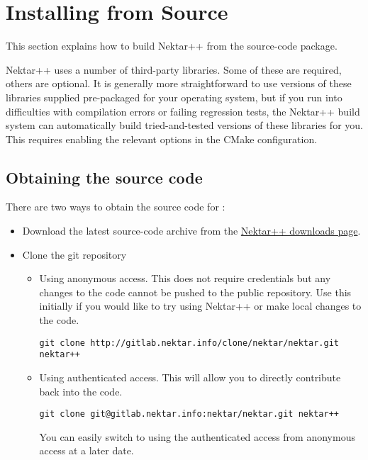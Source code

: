 \section{Installing from Source}
\label{s:installation:source}

This section explains how to build Nektar++ from the source-code package.

Nektar++ uses a number of third-party libraries. Some of these are required,
others are optional. It is generally more straightforward to use versions of
these libraries supplied pre-packaged for your operating system, but if you run
into difficulties with compilation errors or failing regression tests, the
Nektar++ build system can automatically build tried-and-tested versions of these
libraries for you. This requires enabling the relevant options in the CMake
configuration.


\subsection{Obtaining the source code}
There are two ways to obtain the source code for \nekpp:
\begin{itemize}
	\item Download the latest source-code archive from the
	\href{http://www.nektar.info/downloads}{Nektar++ downloads page}.
	\item Clone the git repository
	\begin{itemize}
	\item Using anonymous access. This does not require
	credentials but any changes to the code cannot be pushed to the
	public repository. Use this initially if you would like to try using
	Nektar++ or make local changes to the code.
    \begin{lstlisting}[style=BashInputStyle]
        git clone http://gitlab.nektar.info/clone/nektar/nektar.git nektar++
    \end{lstlisting}
	\item Using authenticated access. This will allow you to directly contribute
	back into the code.
    \begin{lstlisting}[style=BashInputStyle]
        git clone git@gitlab.nektar.info:nektar/nektar.git nektar++
    \end{lstlisting}
    \begin{tipbox}
    You can easily switch to using the authenticated access from anonymous
    access at a later date.
    \end{tipbox}
	\end{itemize}
\end{itemize}

